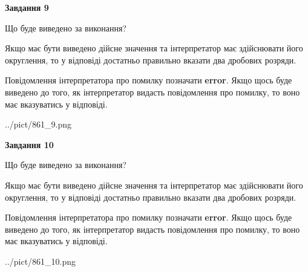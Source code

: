 \documentclass[12pt, ukrainian]{article}
\begin{document}
{\begin {Large}
{\begin {center}\textbf{Завдання 9}\end {center}}\par
Що буде виведено за виконання? \par

Якщо має бути виведено дійсне значення та інтерпретатор має здійснювати його округлення, 
то у відповіді достатньо правильно вказати два дробових розряди.

Повідомлення інтерпретатора про помилку позначати \textbf{error}.
Якщо щось буде виведено до того, як інтерпретатор видасть повідомлення про помилку, 
то воно має вказуватись у відповіді. \par

\begin{center}
	{../pict/861_9.png}
\end{center}
\newpage

{\begin {center}\textbf{Завдання 10}\end {center}}\par
Що буде виведено за виконання? \par

Якщо має бути виведено дійсне значення та інтерпретатор має здійснювати його округлення, 
то у відповіді достатньо правильно вказати два дробових розряди.

Повідомлення інтерпретатора про помилку позначати \textbf{error}.
Якщо щось буде виведено до того, як інтерпретатор видасть повідомлення про помилку, 
то воно має вказуватись у відповіді. \par

\begin{center}
	{../pict/861_10.png}
\end{center}
\newpage

\end {Large}}
\end{document}
